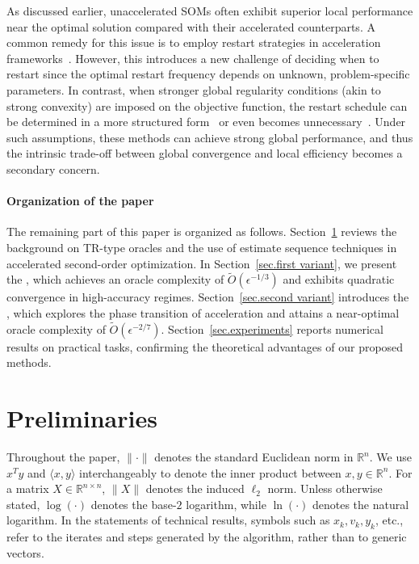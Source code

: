 \documentclass{article}
\begin{document}
As discussed earlier, unaccelerated SOMs often exhibit superior local performance near the optimal solution compared with their accelerated counterparts. A common remedy for this issue is to employ restart strategies in acceleration frameworks~\cite{nesterov2018lectures}. However, this introduces a new challenge of deciding when to restart since the optimal restart frequency depends on unknown, problem-specific parameters. In contrast, when stronger global regularity conditions (akin to strong convexity) are imposed on the objective function, the restart schedule can be determined in a more structured form~\cite{ostroukhov2020tensor, lin2025perseus, huang2025approximation} or even becomes unnecessary~\cite{jiang2022generalized, marquesalves2022variants}. Under such assumptions, these methods can achieve strong global performance, and thus the intrinsic trade-off between global convergence and local efficiency becomes a secondary concern.

\paragraph{Organization of the paper}
The remaining part of this paper is organized as follows. Section~\ref{sec.priliminary} reviews the background on TR-type oracles and the use of estimate sequence techniques in accelerated second-order optimization. In Section~\ref{sec.first variant}, we present the , which achieves an oracle complexity of $\tilde O(\epsilon^{-1/3})$ and exhibits quadratic convergence in high-accuracy regimes. Section~\ref{sec.second variant} introduces the , which explores the phase transition of acceleration and attains a near-optimal oracle complexity of $\tilde O(\epsilon^{-2/7})$. Section~\ref{sec.experiments} reports numerical results on practical tasks, confirming the theoretical advantages of our proposed methods.


\section{Preliminaries}
\label{sec.priliminary}
Throughout the paper, $\|\cdot\|$ denotes the standard Euclidean norm in $\mathbb{R}^n$. We use $x^T y$ and $\langle x,y\rangle$ interchangeably to denote the inner product between $x,y\in\mathbb{R}^n$. For a matrix $X\in\mathbb{R}^{n\times n}$, $\|X\|$ denotes the induced $\ell_2$ norm. Unless otherwise stated, $\log(\cdot)$ denotes the base-$2$ logarithm, while $\ln(\cdot)$ denotes the natural logarithm. In the statements of technical results, symbols such as $x_k,v_k,y_k$, etc., refer to the iterates and steps generated by the algorithm, rather than to generic vectors.
\end{document}
